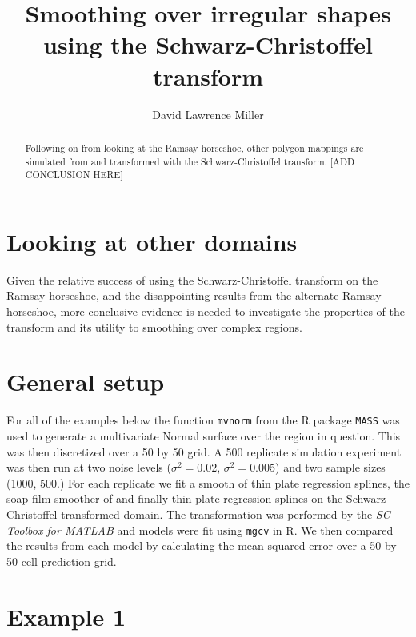 \documentclass[a4paper,10pt]{amsart}
\title{Smoothing over irregular shapes using the Schwarz-Christoffel transform}
\author{David Lawrence Miller}
\newcommand{\sch}{Schwarz-Christoffel }
\begin{document}
\begin{abstract}
Following on from looking at the Ramsay horseshoe, other polygon mappings are simulated from and transformed with the \sch transform. [ADD CONCLUSION HERE]
\end{abstract}


\newtheorem{thm}{Theorem}[section]

\newtheorem{defn}{Definition}[section]

\maketitle



\section{Looking at other domains}

Given the relative success of using the \sch transform on the Ramsay horseshoe, and the disappointing results from the alternate Ramsay horseshoe, more conclusive evidence is needed to investigate the properties of the transform and its utility to smoothing over complex regions.





\section{General setup}

For all of the examples below the function \texttt{mvnorm} from the \textsf{R} package \texttt{MASS} was used to generate a  multivariate Normal surface over the region in question. This was then discretized over a 50 by 50 grid. A 500 replicate simulation experiment was then run at two noise levels ($\sigma^2=0.02$, $\sigma^2=0.005$) and two sample sizes (1000, 500.) For each replicate we fit a smooth of thin plate regression splines, the soap film smoother of \cite{soap} and finally thin plate regression splines on the \sch transformed domain. The transformation was performed by the \textit{SC Toolbox for MATLAB} and models were fit using \texttt{mgcv} in \textsf{R}. We then compared the results from each model by calculating the mean squared error over a 50 by 50 cell prediction grid.

\section{Example 1}
\end{document}
